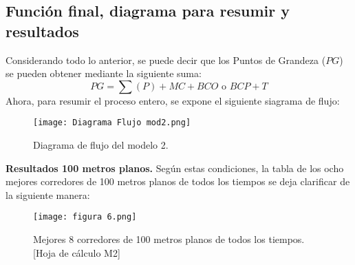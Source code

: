 \documentclass[a4paper]{article}
\begin{document}
\subsection{Función final, diagrama para resumir y resultados}
Considerando todo lo anterior, se puede decir que los Puntos de Grandeza ($PG$) se pueden obtener mediante la siguiente suma: 
\begin{equation*}
    PG = \sum (P) + MC + BCO \text{ o } BCP + T
\end{equation*}
Ahora, para resumir el proceso entero, se expone el siguiente siagrama de flujo:\newline 
\begin{figure}[H]
    \begin{center}
    \texttt{[image: Diagrama Flujo mod2.png]}    
    \end{center}    
    \caption{Diagrama de flujo del modelo 2.}
\end{figure}
\textbf{Resultados 100 metros planos.}
Según estas condiciones, la tabla de los ocho mejores corredores de 100 metros planos de todos los tiempos se deja clarificar de la siguiente manera:\newline
\begin{figure}[H]
    \begin{center}
    \texttt{[image: figura 6.png]}    
    \end{center}    
    \caption{Mejores 8 corredores de 100 metros planos de todos los tiempos. [Hoja de cálculo M2]}
\end{figure}
\end{document}
